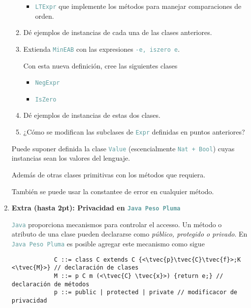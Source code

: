 \documentclass{article}
\newcommand{\tx}[1]{\textcolor{CadetBlue} {\texttt{#1}}}
\newcommand{\tb}[1]{\textcolor{RoyalPurple} {\textbf{#1}}}
\newcommand{\ti}[1]{\textcolor{RoyalPurple} {\textit{#1}}}
\newcommand{\pt}[1]{\textcolor{RoyalPurple}{(#1pt)}}
\newcommand{\tvec}[1]{$\vec{\tx{#1}}$ }
\begin{document}
\begin{enumerate}
\begin{enumerate}
\begin{itemize}
                \item \tx{LTExpr} que implemente los métodos para manejar 
                comparaciones de orden.
            \end{itemize}

            \item Dé ejemplos de instancias de cada una de las clases 
            anteriores.

            \item Extienda \tx{MinEAB} con las expresiones \tx{-e, iszero e}.

            Con esta nueva definición, cree las siguientes clases

            \begin{itemize}
                \item \tx{NegExpr}
                \item \tx{IsZero}
            \end{itemize}

            \item Dé ejemplos de instancias de estas dos clases.

            \item ¿Cómo se modifican las subclases de \tx{Expr} definidas en
            puntos anteriores?
        \end{enumerate}

        Puede suponer definida la clase \tx{Value} (escencialmente 
        \tx{Nat + Bool}) cuyas instancias sean los valores del lenguaje.

        Además de otras clases primitivas con los métodos que requiera.

        También se puede usar la constantee de error en cualquier método.

        \item \tb{Extra \pt{hasta 2}: Privacidad en \tx{Java Peso Pluma}}

        \tx{Java} proporciona mecanismos para controlar el accesso. Un método o
        atributo de una clase pueden declararse como \ti{público, protegido o 
        privado}. En \tx{Java Peso Pluma} es posible agregar este mecanismo como
        sigue

        \begin{verbatim}
            C ::= class C extends C {<\tvec{p}\tvec{C}\tvec{f}>;K <\tvec{M}>} // declaración de clases
            M ::= p C m (<\tvec{C} \tvec{x}>) {return e;} // declaración de métodos
            p ::= public | protected | private // modificacor de privacidad
        \end{verbatim}


\end{enumerate}
\end{document}
